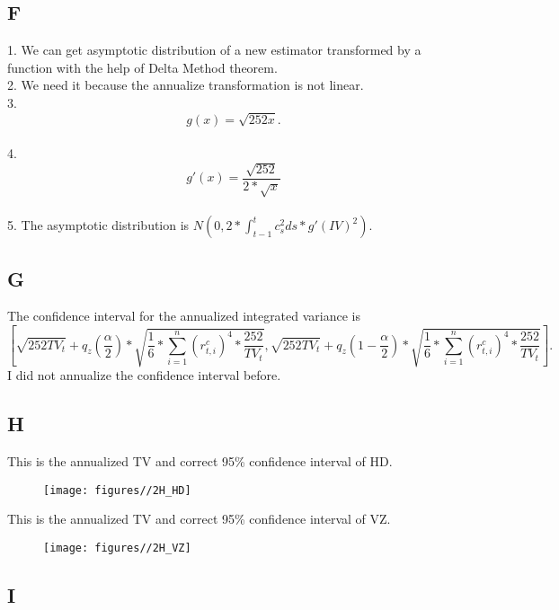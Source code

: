 \documentclass{report}
\begin{document}
\subsection{F}
1. We can get asymptotic distribution of a new estimator transformed by a function with the help of Delta Method theorem.\\
2. We need it because the annualize transformation is not linear.\\
3. \[ g(x) = \sqrt{252x} .\]\\
4. \[ g\prime(x) = \frac{\sqrt{252}}{2*\sqrt{x}} \]\\
5. The asymptotic distribution is $ N ( 0, 2* \int_{t-1}^{t}c_{s}^{2}ds *g\prime(IV)^2) $.

\subsection{G}

The confidence interval for the annualized integrated variance is 
\[ [ \sqrt{252TV_{t}} + q_{z}(\frac{\alpha}{2})*\sqrt{\frac{1}{6}*\sum_{i=1}^{n}(r_{t,i}^{c})^4*\frac{252}{TV_{t}}} , \sqrt{252TV_{t}} + q_{z}(1-\frac{\alpha}{2})*\sqrt{\frac{1}{6}*\sum_{i=1}^{n}(r_{t,i}^{c})^4*\frac{252}{TV_{t}}} ].  \]
I did not annualize the confidence interval before.

\subsection{H}

This is the annualized TV and correct 95\% confidence interval of HD.
\begin{figure}[H]
        \centering 
         \texttt{[image: figures//2H\_HD]}
\end{figure}

This is the annualized TV and correct 95\% confidence interval of VZ.
\begin{figure}[H]
        \centering 
         \texttt{[image: figures//2H\_VZ]}
\end{figure}

\subsection{I}
\end{document}

